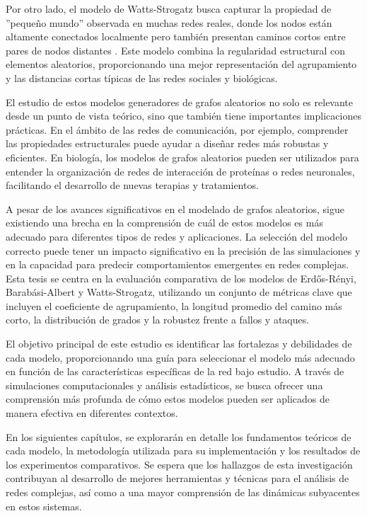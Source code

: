 Por otro lado, el modelo de Watts-Strogatz busca capturar la propiedad de ''pequeño mundo'' observada en muchas redes reales, donde los nodos están altamente conectados localmente pero también presentan caminos cortos entre pares de nodos distantes \citep{Watts1998}. Este modelo combina la regularidad estructural con elementos aleatorios, proporcionando una mejor representación del agrupamiento y las distancias cortas típicas de las redes sociales y biológicas.

El estudio de estos modelos generadores de grafos aleatorios no solo es relevante desde un punto de vista teórico, sino que también tiene importantes implicaciones prácticas. En el ámbito de las redes de comunicación, por ejemplo, comprender las propiedades estructurales puede ayudar a diseñar redes más robustas y eficientes. En biología, los modelos de grafos aleatorios pueden ser utilizados para entender la organización de redes de interacción de proteínas o redes neuronales, facilitando el desarrollo de nuevas terapias y tratamientos.

A pesar de los avances significativos en el modelado de grafos aleatorios, sigue existiendo una brecha en la comprensión de cuál de estos modelos es más adecuado para diferentes tipos de redes y aplicaciones. La selección del modelo correcto puede tener un impacto significativo en la precisión de las simulaciones y en la capacidad para predecir comportamientos emergentes en redes complejas. Esta tesis se centra en la evaluación comparativa de los modelos de Erdős-Rényi, Barabási-Albert y Watts-Strogatz, utilizando un conjunto de métricas clave que incluyen el coeficiente de agrupamiento, la longitud promedio del camino más corto, la distribución de grados y la robustez frente a fallos y ataques.

El objetivo principal de este estudio es identificar las fortalezas y debilidades de cada modelo, proporcionando una guía para seleccionar el modelo más adecuado en función de las características específicas de la red bajo estudio. A través de simulaciones computacionales y análisis estadísticos, se busca ofrecer una comprensión más profunda de cómo estos modelos pueden ser aplicados de manera efectiva en diferentes contextos.

En los siguientes capítulos, se explorarán en detalle los fundamentos teóricos de cada modelo, la metodología utilizada para su implementación y los resultados de los experimentos comparativos. Se espera que los hallazgos de esta investigación contribuyan al desarrollo de mejores herramientas y técnicas para el análisis de redes complejas, así como a una mayor comprensión de las dinámicas subyacentes en estos sistemas.

